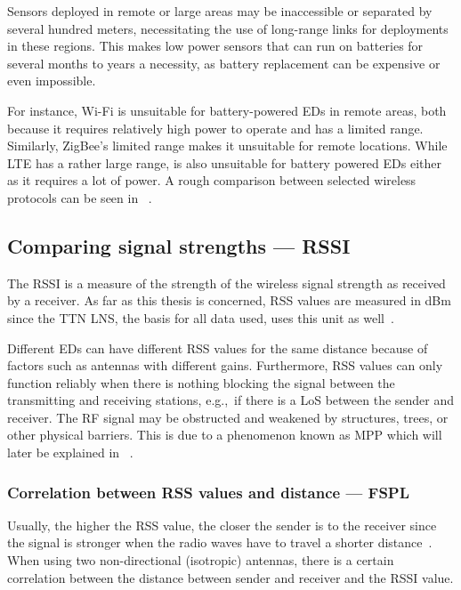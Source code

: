 Sensors deployed in remote or large areas may be inaccessible or separated by several hundred meters, necessitating the use of
long-range links for deployments in these regions.
This makes low power sensors that can run on batteries for several months to years a necessity, as battery replacement can be expensive or even impossible.

For instance, Wi-Fi is unsuitable for battery-powered \aclp{ED} in remote areas, both because it requires relatively high power to operate and has a limited range.
Similarly, ZigBee's limited range makes it unsuitable for remote locations.
While \ac{LTE} has a rather large range, is also unsuitable for battery powered \aclp{ED} either as it requires a lot of power.
A rough comparison between selected wireless protocols can be seen in ~\cite{wang_comparison_2021}.

\subsection{Comparing signal strengths — \acl{RSSI}}\label{sec:rssi}

The \acf{RSSI} is a measure of the strength of the wireless signal strength as received by a receiver.
As far as this thesis is concerned, \ac{RSS} values are measured in dBm since the \ac{TTN} \ac{LNS}, the basis for all data used, uses this unit as well~\cite{the_things_industries_bv_data_2023}.

Different \aclp{ED} can have different \ac{RSS} values for the same distance because of factors such as antennas with different gains.
Furthermore, \ac{RSS} values can only function reliably when there is nothing blocking the signal between the transmitting and receiving stations, e.g.,\ if there is a \ac{LoS} between the sender and receiver.
The \ac{RF} signal may be obstructed and weakened by structures, trees, or other physical barriers.
This is due to a phenomenon known as \acf{MPP} which will later be explained in ~\cite{kucherov_investigation_2021}.

\subsubsection{Correlation between \acs{RSS} values and distance — \acf{FSPL}}\label{sec:background-free-space-path-loss}

Usually, the higher the \ac{RSS} value, the closer the sender is to the receiver since the signal is stronger when the radio waves have to travel a shorter distance~\cite{stutzman_antenna_1981}.
When using two non-directional (isotropic) antennas, there is a certain correlation between the distance between sender and receiver and the \ac{RSSI} value.

